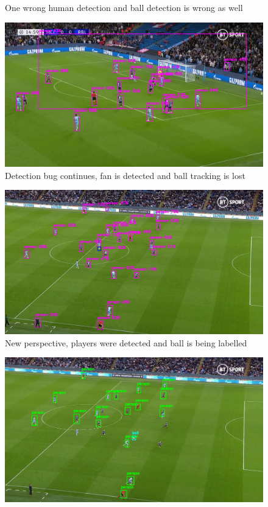 \documentclass[
    11pt,
    twoside
]{report}
\begin{document}
\begin{appendices}
\begin{figure}[H]
    \caption{One wrong human detection and ball detection is wrong as well}
    \label{img:11}
\end{figure}
\begin{figure}[H]
    \includegraphics[keepaspectratio, width=\columnwidth]{Screenshot_2022-03-03_23-08-00.png}
    \caption{Detection bug continues, fan is detected and ball tracking is lost}
    \label{img:12}
\end{figure}
\begin{figure}[H]
    \includegraphics[keepaspectratio, width=\columnwidth]{Screenshot_2022-03-03_23-09-45.png}
    \caption{New perspective, players were detected and ball is being labelled}
    \label{img:13}
\end{figure}
\begin{figure}[H]
    \includegraphics[keepaspectratio, width=\columnwidth]{Screenshot_2022-03-03_23-10-58.png}

\end{figure}
\end{appendices}
\end{document}
